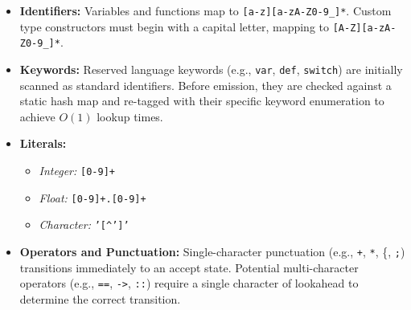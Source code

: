 \documentclass[11pt, a4paper]{article}
\begin{document}
\begin{itemize}
    \item \textbf{Identifiers:} Variables and functions map to \texttt{[a-z][a-zA-Z0-9\_]*}. Custom type constructors must begin with a capital letter, mapping to \texttt{[A-Z][a-zA-Z0-9\_]*}.
    \item \textbf{Keywords:} Reserved language keywords (e.g., \texttt{var}, \texttt{def}, \texttt{switch}) are initially scanned as standard identifiers. Before emission, they are checked against a static hash map and re-tagged with their specific keyword enumeration to achieve $O(1)$ lookup times.
    \item \textbf{Literals:}
    \begin{itemize}
        \item \textit{Integer:} \texttt{[0-9]+}
        \item \textit{Float:} \texttt{[0-9]+.[0-9]+}
        \item \textit{Character:} \texttt{'[\textasciicircum']'}
    \end{itemize}
    \item \textbf{Operators and Punctuation:} Single-character punctuation (e.g., \texttt{+}, \texttt{*}, \{, \texttt{;}) transitions immediately to an accept state. Potential multi-character operators (e.g., \texttt{==}, \texttt{->}, \texttt{::}) require a single character of lookahead to determine the correct transition.
\end{itemize}
\end{document}
